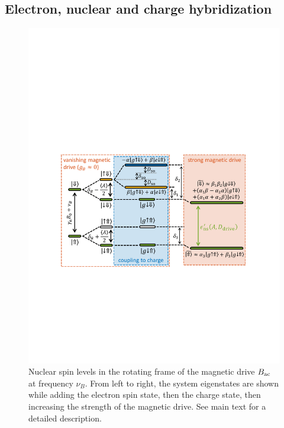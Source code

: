 \subsection{Electron, nuclear and charge hybridization} 

\begin{figure}
	\centering
	\includegraphics[width=\columnwidth]{fig2_levels}
	\caption{
 		Nuclear spin levels in the rotating frame of the magnetic drive $B_{\rm ac}$ at frequency $\nu_B$. From left to right, the system eigenstates are shown while adding the electron spin state, then the charge state, then increasing the strength of the magnetic drive. See main text for a detailed description.}
	\label{fig:levels}
\end{figure}

